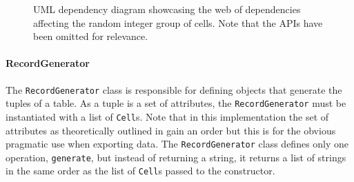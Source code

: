 \begin{figure}[t]
    \caption{UML dependency diagram showcasing the web of dependencies affecting
    the random integer group of cells. Note that the APIs have been omitted for
relevance.}
    \label{fig:project:benchmark:random-integer-cell-dependencies}
\end{figure}

\paragraph{RecordGenerator} The \lstinline{RecordGenerator} class is
responsible for defining objects that generate the tuples of a table. As a tuple
is a set of attributes, the \lstinline{RecordGenerator} must be instantiated
with a list of \lstinline{Cell}s. Note that in this implementation the set of
attributes as theoretically outlined in  gain an
order but this is for the obvious pragmatic use when exporting data. The
\lstinline{RecordGenerator} class defines only one operation,
\lstinline{generate}, but instead of returning a string, it returns a list of
strings in the same order as the list of \lstinline{Cell}s passed to the
constructor.

